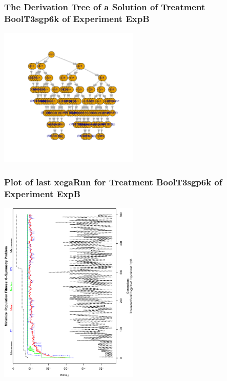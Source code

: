 \documentclass[18pt,c]{beamer}
\begin{document}
 \begin{frame}
 \frametitle{ The Derivation Tree of a Solution of Treatment BoolT3sgp6k of Experiment ExpB }
 \begin{center}
\includegraphics[width=0.5\textwidth, angle=0]
{ExpBDerivationTreeFigure019.pdf}
 \end{center}
 \label{report/ExpBDerivationTreeFigure019.pdf}  
 \end{frame}

 \begin{frame}
 \frametitle{ Plot of last xegaRun for Treatment BoolT3sgp6k of Experiment ExpB }
 \begin{center}
\includegraphics[width=0.5\textwidth, angle=-90]
{ExpBPlotPopStatsFigure019.eps}
 \end{center}
 \label{report/ExpBPlotPopStatsFigure019.eps}  
 \end{frame}
\end{document}
